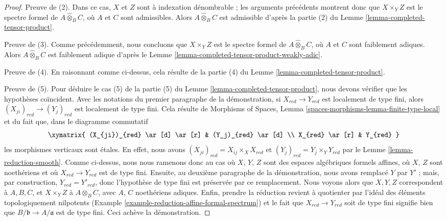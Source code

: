 \begin{proof}
\medskip\noindent
Preuve de (2). Dans ce cas, $X$ et $Z$ sont à indexation dénombrable ;
les arguments précédents montrent donc que $X \times_Y Z$ est le spectre formel
de $A \widehat{\otimes}_B C$, où $A$ et $C$ sont admissibles.
Alors $A \widehat{\otimes}_B C$ est admissible d'après la
partie (2) du Lemme \ref{lemma-completed-tensor-product}.

\medskip\noindent
Preuve de (3). Comme précédemment, nous concluons que $X \times_Y Z$ est le spectre formel
de $A \widehat{\otimes}_B C$, où $A$ et $C$ sont faiblement adiques.
Alors $A \widehat{\otimes}_B C$ est faiblement adique d'après le
Lemme \ref{lemma-completed-tensor-product-weakly-adic}.

\medskip\noindent
Preuve de (4). En raisonnant comme ci-dessus, cela résulte de la
partie (4) du Lemme \ref{lemma-completed-tensor-product}.

\medskip\noindent
Preuve de (5). Pour déduire le cas (5) de la
partie (5) du Lemme \ref{lemma-completed-tensor-product},
nous devons vérifier que les hypothèses coïncident.
Avec les notations du premier paragraphe de la démonstration,
si $X_{red} \to Y_{red}$ est localement de type fini, alors
$(X_{ji})_{red} \to (Y_j)_{red}$ est localement de type fini. Cela résulte de
Morphisms of Spaces, Lemma \ref{spaces-morphisms-lemma-finite-type-local}
et du fait que, dans le diagramme commutatif
$$
\xymatrix{
(X_{ji})_{red} \ar[d] \ar[r] & (Y_j)_{red} \ar[d] \\
X_{red} \ar[r] & Y_{red}
}
$$
les morphismes verticaux sont étales. En effet, nous avons
$(X_{ji})_{red} = X_{ij} \times_X X_{red}$ et
$(Y_j)_{red} = Y_j \times_Y Y_{red}$
par le Lemme \ref{lemma-reduction-smooth}. Comme ci-dessus, nous nous ramenons donc
au cas où $X$, $Y$, $Z$ sont des espaces algébriques formels affines,
où $X$, $Z$ sont noethériens et où $X_{red} \to Y_{red}$ est de type fini.
Ensuite, au deuxième paragraphe de la démonstration, nous avons remplacé $Y$ par $Y'$ ;
mais, par construction, $Y_{red} = Y'_{red}$, donc l'hypothèse de type fini
est préservée par ce remplacement. Nous voyons alors que
$X, Y, Z$ correspondent à $A, B, C$, et $X \times_Y Z$ à
$A \widehat{\otimes}_B C$, avec $A$, $C$ noethériens adiques.
Enfin, prendre la réduction revient à quotienter par
l'idéal des éléments topologiquement nilpotents
(Example \ref{example-reduction-affine-formal-spectrum})
et le fait que $X_{red} \to Y_{red}$ soit de type fini
signifie bien que $B/\mathfrak b \to A/\mathfrak a$ est de type fini.
Ceci achève la démonstration.
\end{proof}

